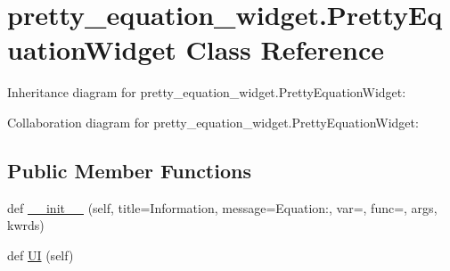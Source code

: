 \hypertarget{classpretty__equation__widget_1_1PrettyEquationWidget}{}\section{pretty\+\_\+equation\+\_\+widget.\+Pretty\+Equation\+Widget Class Reference}
\label{classpretty__equation__widget_1_1PrettyEquationWidget}


Inheritance diagram for pretty\+\_\+equation\+\_\+widget.\+Pretty\+Equation\+Widget\+:


Collaboration diagram for pretty\+\_\+equation\+\_\+widget.\+Pretty\+Equation\+Widget\+:
\subsection*{Public Member Functions}
\begin{DoxyCompactItemize}
\item 
def \hyperlink{classpretty__equation__widget_1_1PrettyEquationWidget_a5858714929d4a983d421984fafc2319f}{\+\_\+\+\_\+init\+\_\+\+\_\+} (self, title=\textquotesingle{}Information\textquotesingle{}, message=\textquotesingle{}Equation\+:\textquotesingle{}, var=\textquotesingle{}\textquotesingle{}, func=\textquotesingle{}\textquotesingle{}, args, kwrds)
\item 
def \hyperlink{classpretty__equation__widget_1_1PrettyEquationWidget_ac7ed9c1b6c285ceac95cd2abfe7d6a05}{UI} (self)
\end{DoxyCompactItemize}
